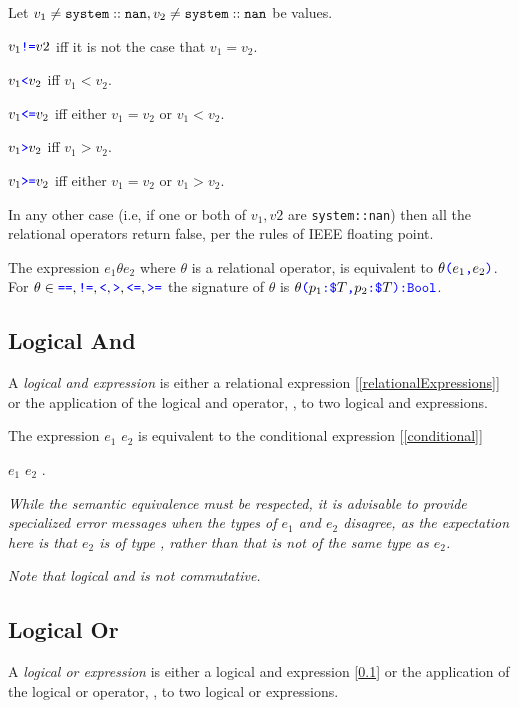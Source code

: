 \documentclass{article}
\begin{document}
{Let $v_1 \ne {\tt system::nan}, v_2 \ne {\tt system::nan}$ be values. 

$v_1 \texttt{\color{blue} !=}{} v2$ iff it is not the case that $v_1 = v_2$.

$v_1 \texttt{\color{blue} \tt<}{} v_2$ iff $v_1 < v_2$.

$v_1 \texttt{\color{blue} \tt<=}{} v_2$ iff either $v_1 = v_2$ or $v_1 < v_2$.

$v_1 \texttt{\color{blue} \tt>}{} v_2$ iff $v_1 > v_2$.

$v_1 \texttt{\color{blue} \tt>=}{} v_2$ iff either $v_1 = v_2$ or $v_1 > v_2$.

In any other case (i.e, if one or both of $v_1, v2$ are {\tt system::nan}) then all the relational operators return false, per the rules of IEEE floating point.

\RelExpression{}
\RelOp{}

The expression $e_1 \theta e_2$ where $\theta$ is a relational operator, is equivalent to $\theta\texttt{\color{blue} (}{}e_1\texttt{\color{blue} ,}{} e_2\texttt{\color{blue} )}$. For $\theta{} \in \texttt{\color{blue} ==}{}, \texttt{\color{blue} !=}{}, \texttt{\color{blue} \tt<}{}, \texttt{\color{blue} \tt>}{}, \texttt{\color{blue} \tt<=}{}, \texttt{\color{blue} \tt>=}{}$ the signature of $\theta$ is $\theta\texttt{\color{blue} (}{}p_1\texttt{\color{blue} :}{} \texttt{\color{blue} \$}{}T\texttt{\color{blue} ,}{} p_2\texttt{\color{blue} :}{} \texttt{\color{blue} \$}{}T\texttt{\color{blue} )}\texttt{\color{blue} :}{}\texttt{\color{blue} Bool}$.


\subsection{Logical And}
\label{logicalAnd}

A {\em logical and expression} is either a relational expression [\ref{relationalExpressions}] or the application of the logical and operator, \AND{}, to two logical and expressions.

\AndExpression{}

The expression $e_1$ \AND{} $e_2$ is equivalent to the conditional expression [\ref{conditional}] 

\IF{} $e_1$ \THEN{} $e_2$ \ELSE{} \FALSE{}.

{\em While the semantic equivalence must be respected, it is advisable to provide specialized error messages when the types of $e_1$ and $e_2$ disagree,  as the expectation here is that $e_2$ is of type \BOOL{}, rather than that \FALSE{} is not of the same type as $e_2$.
}

{\em
Note that logical and is not commutative.
}

\subsection{Logical Or}
\label{logicalOr}

A {\em logical or expression} is either a logical and expression [\ref{logicalAnd}] or the application of the logical or operator, \AND{}, to two logical or expressions.

}
\end{document}

